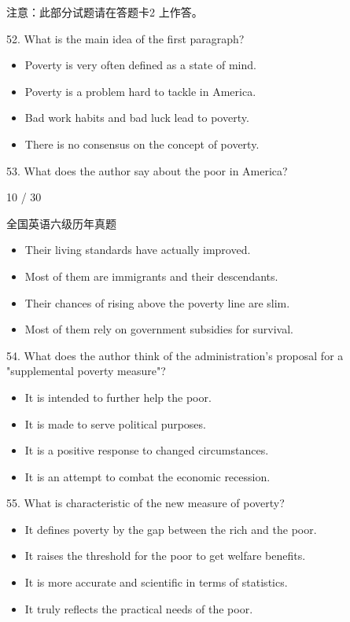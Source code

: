 \documentclass[UTF8,11pt]{ctexart}
\begin{document}
注意：此部分试题请在答题卡2 上作答。


52. What is the main idea of the first paragraph?


\begin{itemize}[leftmargin=2em,itemsep=.2em,topsep=.4em]\item[A.] Poverty is very often defined as a state of mind.
\item[B.] Poverty is a problem hard to tackle in America.
\item[C.] Bad work habits and bad luck lead to poverty.
\item[D.] There is no consensus on the concept of poverty.
\end{itemize}

53. What does the author say about the poor in America?


10 / 30


全国英语六级历年真题


\begin{itemize}[leftmargin=2em,itemsep=.2em,topsep=.4em]\item[A.] Their living standards have actually improved.
\item[B.] Most of them are immigrants and their descendants.
\item[C.] Their chances of rising above the poverty line are slim.
\item[D.] Most of them rely on government subsidies for survival.
\end{itemize}

54. What does the author think of the administration's proposal for a "supplemental poverty measure"?


\begin{itemize}[leftmargin=2em,itemsep=.2em,topsep=.4em]\item[A.] It is intended to further help the poor.
\item[B.] It is made to serve political purposes.
\item[C.] It is a positive response to changed circumstances.
\item[D.] It is an attempt to combat the economic recession.
\end{itemize}

55. What is characteristic of the new measure of poverty?


\begin{itemize}[leftmargin=2em,itemsep=.2em,topsep=.4em]\item[A.] It defines poverty by the gap between the rich and the poor.
\item[B.] It raises the threshold for the poor to get welfare benefits.
\item[C.] It is more accurate and scientific in terms of statistics.
\item[D.] It truly reflects the practical needs of the poor.
\end{itemize}
\end{document}
